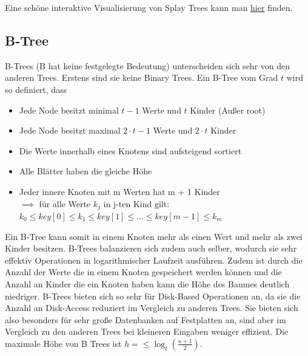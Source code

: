 \documentclass[
../AuD-Zusammenfassung.tex,
]
{subfiles}
\begin{document}
Eine schöne interaktive Visualisierung von Splay Trees kann man \href{https://www.crackr.dev/visualize/max-heap}{hier} finden.

\subsection{B-Tree}
B-Trees (B hat keine festgelegte Bedeutung) unterscheiden sich sehr von den anderen Trees. Erstens sind sie keine Binary Trees. Ein B-Tree vom Grad $t$ wird so definiert, dass
\begin{itemize}
    \item Jede Node besitzt minimal $t - 1$ Werte und $t$ Kinder (Außer root)
    \item Jede Node besitzt maximal $2\cdot t - 1$ Werte und $2\cdot t$ Kinder
    \item Die Werte innerhalb eines Knotens sind aufsteigend sortiert
    \item Alle Blätter haben die gleiche Höhe
    \item Jeder innere Knoten mit m Werten hat m + 1 Kinder \\ $\implies$ für alle Werte $k_j$ in j-ten Kind gilt: $k_0 \leq key[0] \leq k_1 \leq key[1] \leq \ldots \leq key[m-1] \leq k_m $
\end{itemize}
Ein B-Tree kann somit in einem Knoten mehr als einen Wert und mehr als zwei Kinder besitzen. B-Trees balanzieren sich zudem auch selber, wodurch sie sehr effektiv Operationen in logarithmischer Laufzeit ausführen. Zudem ist durch die Anzahl der Werte die in einem Knoten gespeichert werden können und die Anzahl an Kinder die ein Knoten haben kann die Höhe des Baumes deutlich niedriger. B-Trees bieten sich so sehr für Disk-Based Operationen an, da sie die Anzahl an Disk-Access reduziert im Vergleich zu anderen Trees. Sie bieten sich also besonders für sehr große Datenbanken auf Festplatten an, sind aber im Vergleich zu den anderen Trees bei kleineren Eingaben weniger effizient.
Die maximale Höhe von B Trees ist $ h = \leq \log_t(\frac{n + 1}{2})$.
\end{document}

